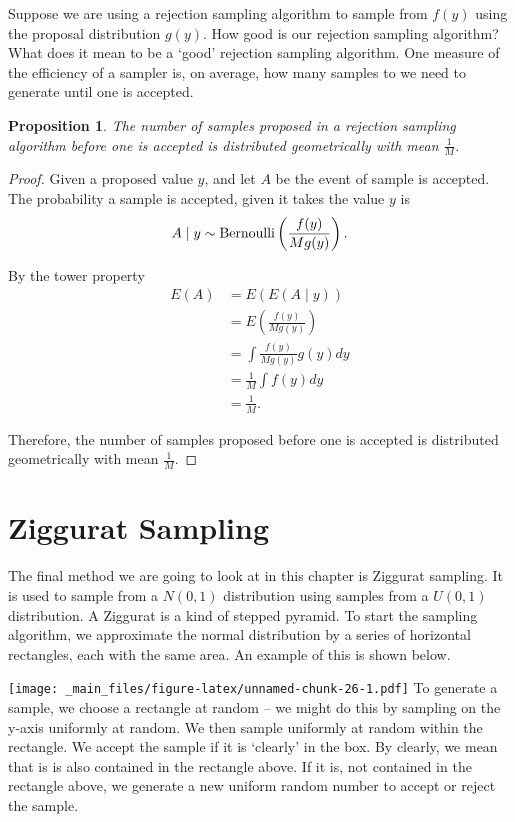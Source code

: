 \documentclass[
]{book}
\newtheorem{proposition}{Proposition}[chapter]
\theoremstyle{definition}
\theoremstyle{definition}
\theoremstyle{definition}
\theoremstyle{definition}
\theoremstyle{remark}
\begin{document}
Suppose we are using a rejection sampling algorithm to sample from \(f(y)\) using the proposal distribution \(g(y)\). How good is our rejection sampling algorithm? What does it mean to be a `good' rejection sampling algorithm. One measure of the efficiency of a sampler is, on average, how many samples to we need to generate until one is accepted.

\begin{proposition}
The number of samples proposed in a rejection sampling algorithm before one is accepted is distributed geometrically with mean \(\frac{1}{M}\).
\end{proposition}

\begin{proof}
Given a proposed value \(y\), and let \(A\) be the event of sample is accepted. The probability a sample is accepted, given it takes the value \(y\) is
\[
A \mid y \sim \hbox{Bernoulli}\left(\frac{f(y)}{Mg(y)}\right).
\]

By the tower property
\begin{align*}
E(A) & = E(E(A\mid y)) \\
& = E\left(\frac{f(y)}{Mg(y)}\right) \\
& = \int \frac{f(y)}{Mg(y)} g(y) dy \\
& = \frac{1}{M}\int f(y) dy \\
& = \frac{1}{M}.
\end{align*}

Therefore, the number of samples proposed before one is accepted is distributed geometrically with mean \(\frac{1}{M}\).
\end{proof}

\hypertarget{ziggurat-sampling}{%
\section{Ziggurat Sampling}\label{ziggurat-sampling}}

The final method we are going to look at in this chapter is Ziggurat sampling. It is used to sample from a \(N(0, 1)\) distribution using samples from a \(U(0, 1)\) distribution. A Ziggurat is a kind of stepped pyramid. To start the sampling algorithm, we approximate the normal distribution by a series of horizontal rectangles, each with the same area. An example of this is shown below.

\texttt{[image: \_main\_files/figure-latex/unnamed-chunk-26-1.pdf]}
To generate a sample, we choose a rectangle at random -- we might do this by sampling on the y-axis uniformly at random. We then sample uniformly at random within the rectangle. We accept the sample if it is `clearly' in the box. By clearly, we mean that is is also contained in the rectangle above. If it is, not contained in the rectangle above, we generate a new uniform random number to accept or reject the sample.
\end{document}
